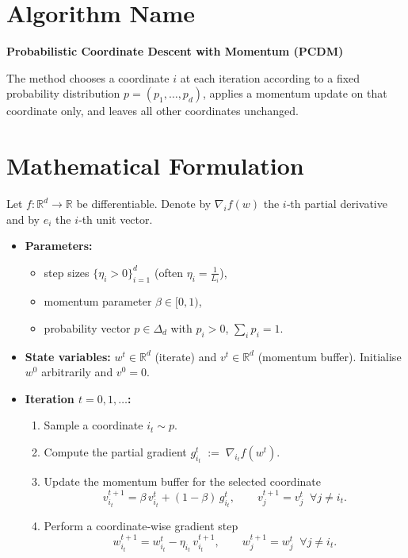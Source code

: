 \documentclass{article}
\newcommand{\R}{\mathbb{R}}
\begin{document}
\section*{Algorithm Name}
\textbf{Probabilistic Coordinate Descent with Momentum (PCDM)}  

The method chooses a coordinate $i$ at each iteration according to a fixed probability distribution $p=(p_1,\dots ,p_d)$, applies a momentum update on that coordinate only, and leaves all other coordinates unchanged.

\section*{Mathematical Formulation}
Let $f:\R^{d}\to\R$ be differentiable.  
Denote by $\nabla_i f(w)$ the $i$‑th partial derivative and by $e_i$ the $i$‑th unit vector.  

\begin{itemize}[leftmargin=*]
  \item \textbf{Parameters:}
  \begin{itemize}
    \item step sizes $\{\eta_i>0\}_{i=1}^{d}$ (often $\eta_i=\frac{1}{L_i}$),
    \item momentum parameter $\beta\in[0,1)$,
    \item probability vector $p\in\Delta_{d}$ with $p_i>0$, $\sum_i p_i=1$.
  \end{itemize}
  \item \textbf{State variables:} $w^{t}\in\R^{d}$ (iterate) and $v^{t}\in\R^{d}$ (momentum buffer).  
    Initialise $w^{0}$ arbitrarily and $v^{0}=0$.
  \item \textbf{Iteration $t=0,1,\dots$:}
  \begin{enumerate}
    \item Sample a coordinate $i_t\sim p$.
    \item Compute the partial gradient $g_{i_t}^{t}\;:=\;\nabla_{i_t} f\!\left(w^{t}\right)$.
    \item Update the momentum buffer for the selected coordinate
          \[
          v_{i_t}^{t+1}= \beta\,v_{i_t}^{t} + (1-\beta)\,g_{i_t}^{t},
          \qquad 
          v_{j}^{t+1}=v_{j}^{t}\;\;\forall j\neq i_t .
          \]
    \item Perform a coordinate‑wise gradient step
          \[
          w_{i_t}^{t+1}= w_{i_t}^{t} - \eta_{i_t}\,v_{i_t}^{t+1},
          \qquad 
          w_{j}^{t+1}= w_{j}^{t}\;\;\forall j\neq i_t .
          \]
  \end{enumerate}
\end{itemize}
\end{document}
